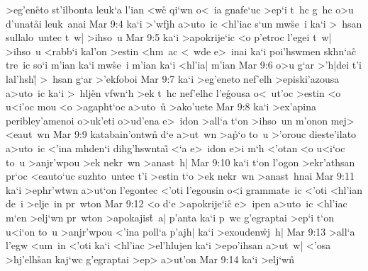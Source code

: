 >eg'en\r{e}to
st'ilbonta
leuk`a
l'ian
<wc\r{}
qi`wn
o<~ia
gnafe`uc
>ep`i
t~hc
g~hc
o>u
d'unat\r{a}i
leuk~anai\bibvsend
\vs Mar 9:4
ka`i
>'wfjh
a>uto~ic
<hl'iac
s`un
mw\r{s}e~i
ka`i
>~hsan
sullalo~untec
t~w|
>ihso~u\bibvsend
\vs Mar 9:5
ka`i
>apokrije`ic
<o
p'etroc
l'egei
t~w|
>ihso~u
<rabb`i
kal'on
>estin
<hm~ac
<~wde
e>~inai
ka`i
poi'hswmen
skhn`ac\r{}
tre~ic
so`i
m'ian
ka`i
mw\r{s}e~i
m'ian
ka`i
<hl'ia|
m'ian\bibvsend
\vs Mar 9:6
o>u
g`ar
>'h|dei
t'i
lal'hsh|\r{}
>~hsan
g`ar
>'ekfoboi\bibvsend
\vs Mar 9:7
ka`i
>eg'eneto
nef'elh
>episki'azousa
a>uto~ic
ka`i
>~hlj\r{e}n
vfwn`h
>ek
t~hc
nef'elhc
l'e\r{g}ousa
o<~ut'oc
>estin
<o
u<i'oc
mou
<o
>agapht`oc
a>uto~u\r{}
>ako'uete\bibvsend
\vs Mar 9:8
ka`i
>ex'apina
peribley'amenoi
o>uk'eti
o>ud'ena
e>~idon
>all`a
t`on
>ihso~un
m'onon
mej>
<eaut~wn\bibvsend
\vs Mar 9:9
katabain'ontwn\r{}
d`e
a>ut~wn
>a\r{p}`o
to~u
>'orouc
dieste'ilato
a>uto~ic
<'ina
mhden`i
dihg'hswntai\r{}
<`a
e>~idon
e>i
m`h
<'otan
<o
u<i`oc
to~u
>anjr'wpou
>ek
nekr~wn
>anast~h|\bibvsend
\vs Mar 9:10
ka`i
t`on
l'ogon
>ekr'athsan
pr`oc
<eauto`uc
suzhto~untec
t'i
>estin
t`o
>ek
nekr~wn
>anast~hnai\bibvsend
\vs Mar 9:11
ka`i
>ephr'wtwn
a>ut`on
l'egontec
<'oti
l'egousin
o<i
grammate~ic
<'oti
<hl'ian
de~i
>elje~in
pr~wton\bibvsend
\vs Mar 9:12
<o
d`e
>apokrije`ic\r{}
e>~ipen
a>uto~ic
<hl'iac
m`en
>elj`wn
pr~wton
>apokajis\r{t}~a|
p'anta
ka`i
p~wc
g'egraptai
>ep`i
t`on
u<i`on
to~u
>anjr'wpou
<'ina
poll`a
p'ajh|
ka`i
>exouden\r{w}j~h|\bibvsend
{}
\vs Mar 9:13
>all`a
l'egw
<um~in
<'oti
ka`i
<hl'iac
>el'hlujen
ka`i
>epo'ihsan
a>ut~w|
<'osa
>hj'elh\r{s}an
kaj`wc
g'egraptai
>ep>
a>ut'on\bibvsend
\vs Mar 9:14
ka`i
>elj`w\r{n}
